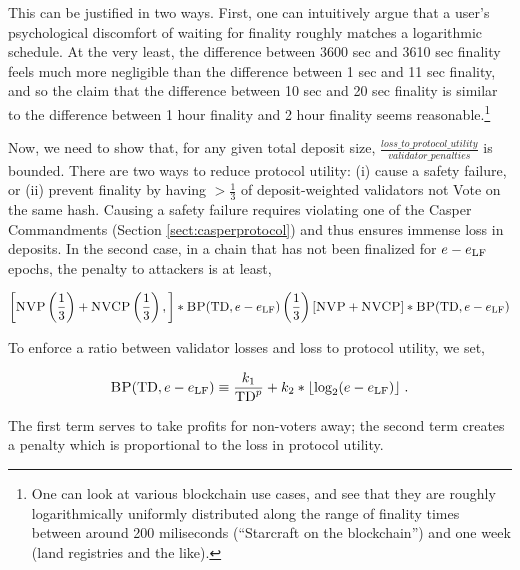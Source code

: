 \documentclass[12pt, final]{article}
\newcommand{\epoch}{\ensuremath{e}\space}
\newcommand{\totaldeposit}{\textnormal{TD}\space}
\newcommand{\epochLF}{\ensuremath{\epoch_{\textnormal{LF}}}\space}
\newcommand{\BP}{\textsc{BP}\space}
\newcommand{\NVP}{\textsc{NVP}\space}
\newcommand{\NVCP}{\textsc{NVCP}\space}
\begin{document}
This can be justified in two ways. First, one can intuitively argue that a user's psychological discomfort of waiting for finality roughly matches a logarithmic schedule. At the very least, the difference between 3600 sec and 3610 sec finality feels much more negligible than the difference between 1 sec and 11 sec finality, and so the claim that the difference between 10 sec and 20 sec finality is similar to the difference between 1 hour finality and 2 hour finality seems reasonable.\footnote{One can look at various blockchain use cases, and see that they are roughly logarithmically uniformly distributed along the range of finality times between around 200 miliseconds (``Starcraft on the blockchain'') and one week (land registries and the like). }

Now, we need to show that, for any given total deposit size, $\frac{loss\_to\_protocol\_utility}{validator\_penalties}$ is bounded. There are two ways to reduce protocol utility: (i) cause a safety failure, or (ii) prevent finality by having $> \frac{1}{3}$ of deposit-weighted validators not Vote on the same hash.  Causing a safety failure requires violating one of the Casper Commandments (Section \ref{sect:casperprotocol}) and thus ensures immense loss in deposits.  In the second case, in a chain that has not been finalized for $\epoch - \epochLF$ epochs, the penalty to attackers is at least,

\begin{equation}
\left[ \NVP \left(\frac{1}{3}\right) + \NVCP\left(\frac{1}{3}\right), \right] * \BP(\totaldeposit, \epoch - \epochLF) \\
\left(\frac{1}{3}\right) \left[ \NVP + \NVCP \right] * \BP(\totaldeposit, \epoch - \epochLF) \\
\end{equation}

To enforce a ratio between validator losses and loss to protocol utility, we set,

\begin{equation}
\BP(\totaldeposit, \epoch - \epochLF) \equiv \frac{k_1}{\totaldeposit^p} + k_2 * \lfloor \log_2(\epoch - \epochLF) \rfloor\; .
\end{equation}

The first term serves to take profits for non-voters away; the second term creates a penalty which is proportional to the loss in protocol utility.
\end{document}

